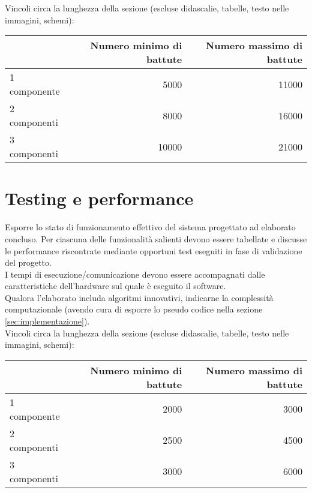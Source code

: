 \documentclass[12pt]{article}
\begin{document}
Vincoli circa la lunghezza della sezione (escluse didascalie, tabelle, testo nelle immagini, schemi):

\vspace{1cm}
\begin{tabular}{l|rr}
 & Numero minimo di battute & Numero massimo di battute \\
 \hline
 1 componente & 5000 & 11000 \\
 2 componenti & 8000 & 16000 \\
 3 componenti & 10000 & 21000 \\
 \hline
\end{tabular}


\newpage



\section{Testing e performance}

Esporre lo stato di funzionamento effettivo del sistema progettato ad elaborato concluso. Per ciascuna delle funzionalità salienti devono essere tabellate e discusse le performance riscontrate mediante opportuni test eseguiti in fase di validazione del progetto.\\

I tempi di esecuzione/comunicazione devono essere accompagnati dalle caratteristiche dell'hardware sul quale è eseguito il software.\\

Qualora l'elaborato includa algoritmi innovativi, indicarne la complessità computazionale (avendo cura di esporre lo pseudo codice nella sezione \ref{sec:implementazione}).\\


Vincoli circa la lunghezza della sezione (escluse didascalie, tabelle, testo nelle immagini, schemi):

\vspace{1cm}
\begin{tabular}{l|rr}
 & Numero minimo di battute & Numero massimo di battute \\
 \hline
 1 componente & 2000 & 3000 \\
 2 componenti & 2500 & 4500 \\
 3 componenti & 3000 & 6000 \\
 \hline
\end{tabular}
\end{document}
